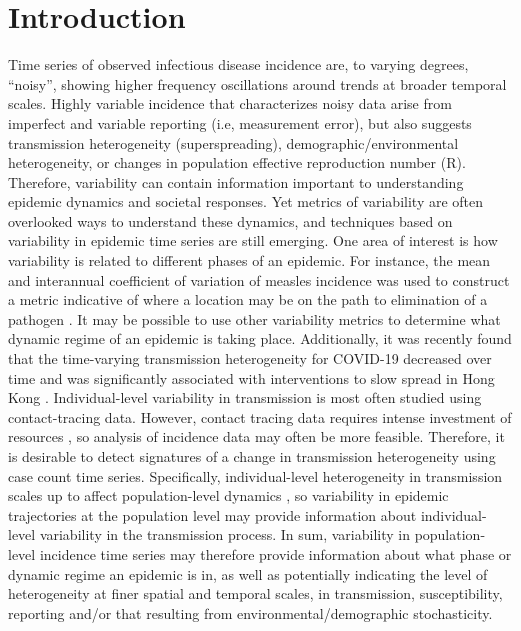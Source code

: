 \documentclass[10pt,letterpaper]{article}
\begin{document}
\linenumbers

\section*{Introduction}
Time series of observed infectious disease incidence are, to varying degrees, ``noisy'', showing higher frequency oscillations around trends at broader temporal scales.
Highly variable incidence that characterizes noisy data arise from imperfect and variable reporting (i.e, measurement error), but also suggests transmission heterogeneity (superspreading), demographic/environmental heterogeneity, or changes in population effective reproduction number (R).
Therefore, variability can contain information important to understanding epidemic dynamics and societal responses. 
Yet metrics of variability are often overlooked ways to understand these dynamics, and techniques based on variability in epidemic time series are still emerging. 
One area of interest is how variability is related to different phases of an epidemic. 
For instance, the mean and interannual coefficient of variation of measles incidence was used to construct a metric indicative of where a location may be on the path to elimination of a pathogen \cite{graham_measles_2019}. 
It may be possible to use other variability metrics to determine what dynamic regime of an epidemic is taking place. 
Additionally, it was recently found that the time-varying transmission heterogeneity for COVID-19 decreased over time and was significantly associated with interventions to slow spread in Hong Kong \cite{adam_time-varying_2022}. 
Individual-level variability in transmission is most often studied using contact-tracing data. 
However, contact tracing data requires intense investment of resources \cite{kretzschmar_impact_2020}, so analysis of incidence data may often be more feasible. 
Therefore, it is desirable to detect signatures of a change in transmission heterogeneity using case count time series. Specifically, individual-level heterogeneity in transmission scales up to affect population-level dynamics \cite{lloyd-smith_superspreading_2005}, so variability in epidemic trajectories at the population level may provide information about individual-level variability in the transmission process.
In sum, variability in population-level incidence time series may therefore provide information about what phase or dynamic regime an epidemic is in, as well as potentially indicating the level of heterogeneity at finer spatial and temporal scales, in transmission, susceptibility, reporting and/or that resulting from environmental/demographic stochasticity. 
\end{document}
